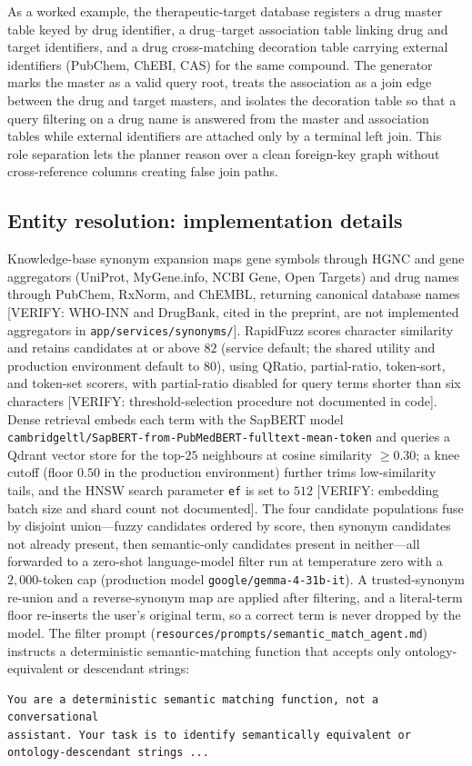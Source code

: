 As a worked example, the therapeutic-target database registers a drug master table keyed by drug identifier, a drug--target association table linking drug and target identifiers, and a drug cross-matching decoration table carrying external identifiers (PubChem, ChEBI, CAS) for the same compound. The generator marks the master as a valid query root, treats the association as a join edge between the drug and target masters, and isolates the decoration table so that a query filtering on a drug name is answered from the master and association tables while external identifiers are attached only by a terminal left join. This role separation lets the planner reason over a clean foreign-key graph without cross-reference columns creating false join paths.

\subsection*{Entity resolution: implementation details}

Knowledge-base synonym expansion maps gene symbols through HGNC and gene aggregators (UniProt, MyGene.info, NCBI Gene, Open Targets) and drug names through PubChem, RxNorm, and ChEMBL, returning canonical database names [VERIFY: WHO-INN and DrugBank, cited in the preprint, are not implemented aggregators in \texttt{app/services/synonyms/}]. RapidFuzz scores character similarity and retains candidates at or above $82$ (service default; the shared utility and production environment default to $80$), using QRatio, partial-ratio, token-sort, and token-set scorers, with partial-ratio disabled for query terms shorter than six characters [VERIFY: threshold-selection procedure not documented in code]. Dense retrieval embeds each term with the SapBERT model \texttt{cambridgeltl/SapBERT-from-PubMedBERT-fulltext-mean-token} and queries a Qdrant vector store for the top-$25$ neighbours at cosine similarity $\geq 0.30$; a knee cutoff (floor $0.50$ in the production environment) further trims low-similarity tails, and the HNSW search parameter \texttt{ef} is set to $512$ [VERIFY: embedding batch size and shard count not documented]. The four candidate populations fuse by disjoint union---fuzzy candidates ordered by score, then synonym candidates not already present, then semantic-only candidates present in neither---all forwarded to a zero-shot language-model filter run at temperature zero with a $2{,}000$-token cap (production model \texttt{google/gemma-4-31b-it}). A trusted-synonym re-union and a reverse-synonym map are applied after filtering, and a literal-term floor re-inserts the user's original term, so a correct term is never dropped by the model. The filter prompt (\texttt{resources/prompts/semantic\_match\_agent.md}) instructs a deterministic semantic-matching function that accepts only ontology-equivalent or descendant strings:
\begin{verbatim}
You are a deterministic semantic matching function, not a conversational
assistant. Your task is to identify semantically equivalent or
ontology-descendant strings ...
\end{verbatim}

